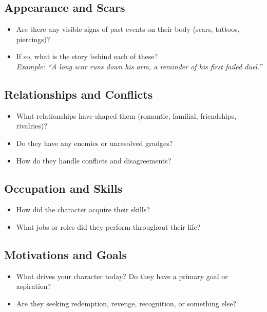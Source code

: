 \documentclass[12pt]{book}  %
\begin{document}
\subsection*{Appearance and Scars}

\begin{itemize}
    \item Are there any visible signs of past events on their body (scars, tattoos, piercings)?
    \item If so, what is the story behind each of these? \\
    \textit{Example: ``A long scar runs down his arm, a reminder of his first failed duel.''}
\end{itemize}

\subsection*{Relationships and Conflicts}

\begin{itemize}
    \item What relationships have shaped them (romantic, familial, friendships, rivalries)?
    \item Do they have any enemies or unresolved grudges?
    \item How do they handle conflicts and disagreements?
\end{itemize}

\subsection*{Occupation and Skills}

\begin{itemize}
    \item How did the character acquire their skills?
    \item What jobs or roles did they perform throughout their life?
\end{itemize}

\subsection*{Motivations and Goals}

\begin{itemize}
    \item What drives your character today? Do they have a primary goal or aspiration?
    \item Are they seeking redemption, revenge, recognition, or something else?
\end{itemize}
\end{document}
